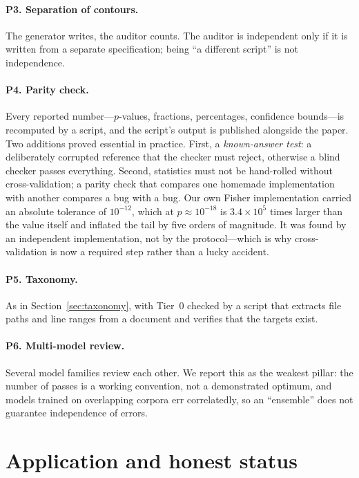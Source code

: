 \documentclass[11pt]{article}
\begin{document}
\paragraph{P3. Separation of contours.} The generator writes, the auditor
counts. The auditor is independent only if it is written from a separate
specification; being ``a different script'' is not independence.

\paragraph{P4. Parity check.} Every reported number---$p$-values, fractions,
percentages, confidence bounds---is recomputed by a script, and the script's
output is published alongside the paper. Two additions proved essential in
practice. First, a \emph{known-answer test}: a deliberately corrupted reference
that the checker must reject, otherwise a blind checker passes everything.
Second, statistics must not be hand-rolled without cross-validation; a parity
check that compares one homemade implementation with another compares a bug with
a bug. Our own Fisher implementation carried an absolute tolerance of
$10^{-12}$, which at $p \approx 10^{-18}$ is $3.4\times10^{5}$ times larger than
the value itself and inflated the tail by five orders of magnitude. It was found
by an independent implementation, not by the protocol---which is why
cross-validation is now a required step rather than a lucky accident.

\paragraph{P5. Taxonomy.} As in Section~\ref{sec:taxonomy}, with Tier~0 checked
by a script that extracts file paths and line ranges from a document and
verifies that the targets exist.

\paragraph{P6. Multi-model review.} Several model families review each other. We
report this as the weakest pillar: the number of passes is a working convention,
not a demonstrated optimum, and models trained on overlapping corpora err
correlatedly, so an ``ensemble'' does not guarantee independence of errors.

\section{Application and honest status}
\label{sec:status}
\end{document}
